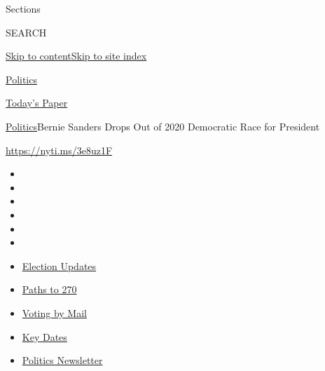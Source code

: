 Sections

SEARCH

\protect\hyperlink{site-content}{Skip to
content}\protect\hyperlink{site-index}{Skip to site index}

\href{https://www.nytimes3xbfgragh.onion/section/politics}{Politics}

\href{https://myaccount.nytimes3xbfgragh.onion/auth/login?response_type=cookie\&client_id=vi}{}

\href{https://www.nytimes3xbfgragh.onion/section/todayspaper}{Today's
Paper}

\href{/section/politics}{Politics}\textbar{}Bernie Sanders Drops Out of
2020 Democratic Race for President

\url{https://nyti.ms/3e8uz1F}

\begin{itemize}
\item
\item
\item
\item
\item
\item
\end{itemize}

\begin{itemize}
\item
  \href{https://www.nytimes3xbfgragh.onion/live/2020/09/07/us/trump-vs-biden?action=click\&pgtype=Article\&state=default\&region=TOP_BANNER\&context=storylines_menu}{Election
  Updates}
\item
  \href{https://www.nytimes3xbfgragh.onion/interactive/2020/us/elections/election-states-biden-trump.html?action=click\&pgtype=Article\&state=default\&region=TOP_BANNER\&context=storylines_menu}{Paths
  to 270}
\item
  \href{https://www.nytimes3xbfgragh.onion/interactive/2020/08/31/us/politics/vote-by-mail-deadlines.html?action=click\&pgtype=Article\&state=default\&region=TOP_BANNER\&context=storylines_menu}{Voting
  by Mail}
\item
  \href{https://www.nytimes3xbfgragh.onion/interactive/2019/us/elections/2020-presidential-election-calendar.html?action=click\&pgtype=Article\&state=default\&region=TOP_BANNER\&context=storylines_menu}{Key
  Dates}
\item
  \href{https://www.nytimes3xbfgragh.onion/newsletters/politics?action=click\&pgtype=Article\&state=default\&region=TOP_BANNER\&context=storylines_menu}{Politics
  Newsletter}
\end{itemize}

